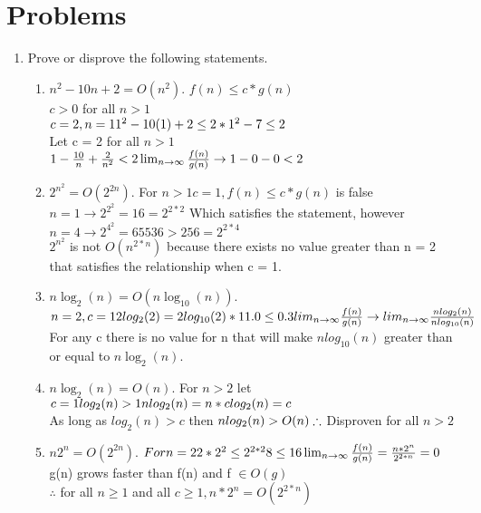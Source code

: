 \documentclass[11pt]{amsart}
\begin{document}
\section*{Problems}

%


\begin{enumerate}
\item Prove or disprove the following statements.
\begin{enumerate}
\item $n^2 - 10n + 2 = O(n^2)$.
\subitem $f(n)\leq c*g(n)$\\$c>0$ for all $n>1$\\$c=2, n=1\\1^2-10(1)+2\leq 2*1^2\\-7\leq 2$\\Let c = 2 for all $n > 1$\\$1-\frac{10}{n}+\frac{2}{n^2}<2\\\lim_{n \to \infty}\frac{f(n)}{g(n)}\rightarrow 1 - 0 - 0 < 2$  
\item $2^{n^2} = O(2^{2n})$.
\subitem For $n > 1 c = 1, f(n)\leq c*g(n)$ is false\\$n=1 \rightarrow 2^{2^2} = 16 = 2^{2*2}$ Which satisfies the statement, however\\$n = 4 \rightarrow 2^{4^2} = 65536 > 256 = 2^{2*4}$\\$2^{n^2}$ is not $O(n^{2*n})$ because there exists no value greater than n = 2 that satisfies the relationship when c = 1.
\item $n\log_2(n) = O(n\log_{10}(n))$.
\subitem $n = 2, c = 1\\2log_2(2) = 2log_{10}(2)*1\\1.0 \leq 0.3\\lim_{n \to \infty}\frac{f(n)}{g(n)} \rightarrow lim_{n \to \infty}\frac{nlog_2(n)}{nlog_{10}(n)}$\\For any c there is no value for n that will make $nlog_{10}(n)$ greater than or equal to $n\log_2(n)$.
\item $n\log_2(n) = O(n)$.
\subitem For $n>2$ let $c = 1\\log_2(n) > 1\\nlog_2(n)=n*c\\log_2(n)=c$\\As long as $log_2(n) > c$ then $nlog_2(n) > O(n)\\\therefore$ Disproven for all $n>2$ 
\item $n2^n = O(2^{2n})$.
\subitem $For n = 2\\2*2^2 \leq 2^{2*2}\\8 \leq 16\\\lim_{n \to \infty}\frac{f(n)}{g(n)} =\frac{n*2^n}{2^{2*n}} = 0$\\g(n) grows faster than f(n) and f $\in O(g)$\\$\therefore$ for all $n\geq 1$ and all $c \geq 1, n*2^n = O(2^{2*n})$
\end{enumerate}





\end{enumerate}
\end{document}
